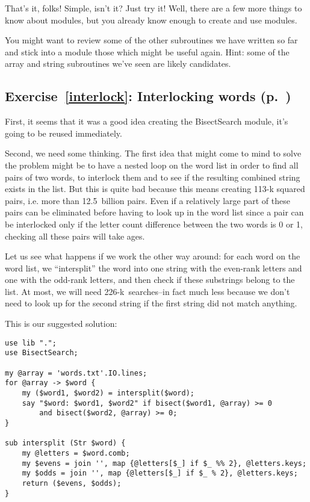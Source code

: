 That's it, folks! Simple, isn't it? Just try it! Well, there 
are a few more things to know about modules, but you 
already know enough to create and use modules. 

You might want to review some of the other subroutines we 
have written so far and stick into a module those which 
might be useful again. Hint: some of the array and string 
subroutines we've seen are likely candidates.

\subsection{Exercise~\ref{interlock}: Interlocking words (p.~\pageref{interlock})}
\label{sol_interlock}

First, it seems that it was a good idea creating the 
BisectSearch module, it's going to be reused immediately.

Second, we need some thinking. The first idea that might 
come to mind to solve the problem might be to have a 
nested loop on the word list in order to find all pairs 
of two words, to interlock them and to see if the resulting 
combined string exists in the list. But this is quite bad 
because this means creating 113-k squared pairs, i.e. more 
than 12.5~billion pairs. Even if a relatively large part 
of these pairs can be eliminated before having to look up in 
the word list since a pair can be interlocked only if the 
letter count difference between the two words is 0 or 1, 
checking all these pairs will take ages.

Let us see what happens if we work the other way around: for 
each word on the word list, we ``intersplit'' the word into 
one string with the even-rank letters and one with the odd-rank 
letters, and then check if these substrings belong to the 
list. At most, we will need 226-k~searches--in fact much less 
because we don't need to look up for the second string if the 
first string did not match anything.

This is our suggested solution:
\begin{verbatim}
use lib ".";
use BisectSearch;

my @array = 'words.txt'.IO.lines;
for @array -> $word {
    my ($word1, $word2) = intersplit($word);
    say "$word: $word1, $word2" if bisect($word1, @array) >= 0 
        and bisect($word2, @array) >= 0;
}

sub intersplit (Str $word) {
    my @letters = $word.comb;
    my $evens = join '', map {@letters[$_] if $_ %% 2}, @letters.keys;
    my $odds = join '', map {@letters[$_] if $_ % 2}, @letters.keys;
    return ($evens, $odds);
}
\end{verbatim}

